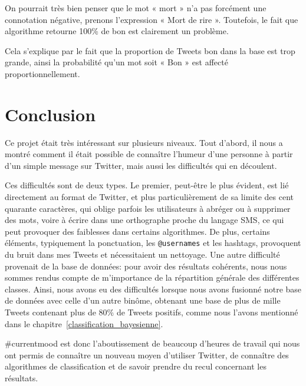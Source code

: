 \documentclass[12pt,a4paper]{report}
\newcommand{\CMName}{\#currentmood}
\begin{document}
On pourrait très bien penser que le mot « mort » n'a pas forcément une
connotation négative, prenons l'expression « Mort de rire ». Toutefois, le fait
que algorithme retourne 100\% de bon est clairement un problème.

Cela s'explique par le fait que la proportion de Tweets bon dans la base est
trop grande, ainsi la probabilité qu'un mot soit « Bon » est affecté
proportionnellement.


\chapter{Conclusion}
Ce projet était très intéressant sur plusieurs niveaux. Tout d'abord, il nous a
montré comment il était possible de connaître l'humeur d'une personne à partir
d'un simple message sur Twitter, mais aussi les difficultés qui en découlent.

Ces difficultés sont de deux types. Le premier, peut-être le plus évident, est
lié directement au format de Twitter, et plus particulièrement de sa limite des
cent quarante caractères, qui oblige parfois les utilisateurs à abréger ou à
supprimer des mots, voire à écrire dans une orthographe proche du langage SMS,
ce qui peut provoquer des faiblesses dans certains algorithmes. De plus,
certains éléments, typiquement la ponctuation, les \texttt{@usernames} et les
hashtags, provoquent du bruit dans mes Tweets et nécessitaient un nettoyage.
Une autre difficulté provenait de la base de données: pour avoir des résultats
cohérents, nous nous sommes rendus compte de m'importance de la répartition
générale des différentes classes. Ainsi, nous avons eu des difficultés lorsque
nous avons fusionné notre base de données avec celle d'un autre binôme, obtenant
une base de plus de mille Tweets contenant plus de 80\% de Tweets positifs,
comme nous l'avons mentionné dans le chapitre~\ref{classification_bayesienne}.

\CMName{} est donc l'aboutissement de beaucoup d'heures de travail qui nous ont
permis de connaître un nouveau moyen d'utiliser Twitter, de connaître des
algorithmes de classification et de savoir prendre du recul concernant les
résultats.
\end{document}
